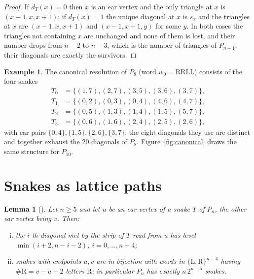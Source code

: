 \documentclass[11pt,a4paper]{article}
\newtheorem{lemma}[theorem]{Lemma}
\theoremstyle{definition}
\newtheorem{example}[theorem]{Example}
\theoremstyle{remark}
\newcommand{\Li}{\mathrm{L}}
\newcommand{\Ri}{\mathrm{R}}
\begin{document}
\begin{proof}
If $d_T(x)=0$ then $x$ is an ear vertex and the only triangle at $x$ is $(x-1,x,x+1)$; if
$d_T(x)=1$ the unique diagonal at $x$ is $s_x$ and the triangles at $x$ are
$(x-1,x,x+1)$ and $(x-1,x+1,y)$ for some $y$.  In both cases the triangles not containing
$x$ are unchanged and none of them is lost, and their number drops from $n-2$ to $n-3$,
which is the number of triangles of $P_{n-1}$; their diagonals are exactly the survivors.
\end{proof}

\begin{example}
The canonical resolution of $P_8$ (word $w_0=\Ri\Ri\Li\Li$) consists of the four snakes
\[
\begin{aligned}
  T_0&=\{(1,7),(2,7),(3,5),(3,6),(3,7)\},\\
  T_1&=\{(0,2),(0,3),(0,4),(4,6),(4,7)\},\\
  T_2&=\{(0,5),(1,3),(1,4),(1,5),(5,7)\},\\
  T_3&=\{(0,6),(1,6),(2,4),(2,5),(2,6)\},
\end{aligned}
\]
with ear pairs $\{0,4\},\{1,5\},\{2,6\},\{3,7\}$; the eight diagonals they use are distinct
and together exhaust the $20$ diagonals of $P_8$.
Figure~\ref{fig:canonical} draws the same structure for $P_{10}$.
\end{example}

\section{Snakes as lattice paths}

\begin{lemma}[\label{lem:strip}]
Let $n\ge5$ and let $u$ be an ear vertex of a snake $T$ of $P_n$, the other ear vertex
being $v$.  Then:
\begin{enumerate}[(i)] $v=u+\#\Ri(w)+2$ for a word $w\in\{\Li,\Ri\}^{n-4}$ with
$\#\Li(w)=n-4-\#\Ri(w)$; in particular $v$ is determined by $\#\Ri(w)$;
\item the $i$-th diagonal met by the strip of $T$ read from $u$ has level
$\min(i+2,n-i-2)$, $i=0,\dots,n-4$;
\item snakes with endpoints $u,v$ are in bijection with words in
$\{\Li,\Ri\}^{n-4}$ having $\#\Ri=v-u-2$ letters $\Ri$; in particular $P_n$ has exactly
$n\,2^{n-5}$ snakes.
\end{enumerate}
\end{lemma}
\end{document}
